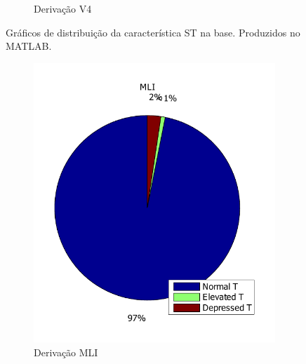 \begin{figure}[ht]
\begin{subfigure}[b]{.4\textwidth}
        \caption{Derivação V4}
        \label{fig:v4stclass}
    \end{subfigure}
    \caption[Gráficos de distribuição da característica ST na base]{Gráficos de distribuição da característica ST na base. Produzidos no MATLAB.}
\end{figure}

\begin{figure}[ht]
    \centering
    \begin{subfigure}[b]{.4\textwidth}
        \includegraphics[width=\textwidth]{figures/chap6-mli-t-class-dist.pdf}
        \caption{Derivação MLI}
        \label{fig:mlitclass}
    \end{subfigure}
    \begin{subfigure}[b]{.4\textwidth}

\end{subfigure}
\end{figure}
